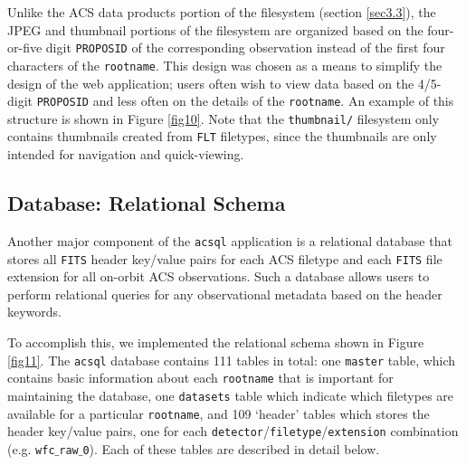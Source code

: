 \documentclass[10pt,journal,compsoc]{IEEEtran}
\begin{document}
Unlike the ACS data products portion of the filesystem (section \ref{sec3.3}), the JPEG and thumbnail portions of the filesystem are organized based on the
four-or-five digit \texttt{PROPOSID} of the corresponding observation instead of the first four characters of the \texttt{rootname}.  This design was chosen as a means to simplify the
design of the web application; users often wish to view data based on the 4/5-digit \texttt{PROPOSID} and less often on the details of the \texttt{rootname}.  An example of this
structure is shown in Figure \ref{fig10}.  Note that the \texttt{thumbnail/} filesystem only contains thumbnails created from \texttt{FLT} filetypes, since the thumbnails are only
intended for navigation and quick-viewing.


\subsection{Database: Relational Schema} \label{sec3.5}

Another major component of the \texttt{acsql} application is a relational database that stores all \texttt{FITS} header key/value pairs for each ACS filetype and each \texttt{FITS} file
extension for all on-orbit ACS observations.  Such a database allows users to perform relational queries for any observational metadata based on the header keywords.

To accomplish this, we implemented the relational schema shown in Figure \ref{fig11}.  The \texttt{acsql} database contains 111 tables in total: one \texttt{master} table, which contains
basic information about each \texttt{rootname} that is important for maintaining the database, one \texttt{datasets} table which indicate which filetypes are available for a
particular \texttt{rootname}, and 109 `header' tables which stores the header key/value pairs, one for each \texttt{detector}/\texttt{filetype}/\texttt{extension} combination (e.g.
\texttt{wfc$\_$raw$\_$0}).  Each of these tables are described in detail below.
\end{document}
